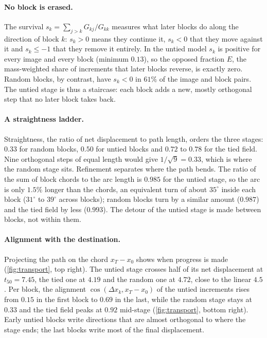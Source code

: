 \paragraph{No block is erased.}
The survival $s_k=\sum_{j>k}G_{kj}/G_{kk}$ measures what later blocks do along the
direction of block $k$: $s_k>0$ means they continue it, $s_k<0$ that they move against
it and $s_k\le-1$ that they remove it entirely.
In the untied model $s_k$ is positive for every image and every block (minimum $0.13$),
so the opposed fraction $E$, the mass-weighted share of increments that later blocks
reverse, is exactly zero.
Random blocks, by contrast, have $s_k<0$ in $61\%$ of the image and block pairs.
The untied stage is thus a staircase: each block adds a new, mostly orthogonal step
that no later block takes back.

\paragraph{A straightness ladder.}
Straightness, the ratio of net displacement to path length, orders the three stages:
$0.33$ for random blocks, $0.50$ for untied blocks and $0.72$ to $0.78$ for the tied
field.
Nine orthogonal steps of equal length would give $1/\sqrt 9=0.33$, which is where the
random stage sits.
Refinement separates where the path bends.
The ratio of the sum of block chords to the arc length is $0.985$ for the untied
stage, so the arc is only $1.5\%$ longer than the chords, an equivalent turn of about
$35^\circ$ inside each block ($31^\circ$ to $39^\circ$ across blocks); random blocks
turn by a similar amount ($0.987$) and the tied field by less ($0.993$).
The detour of the untied stage is made between blocks, not within them.

\paragraph{Alignment with the destination.}
Projecting the path on the chord $x_T-x_0$ shows when progress is made
(\cref{fig:transport}, top right).
The untied stage crosses half of its net displacement at $t_{50}{=}7.45$, the tied one
at $4.19$ and the random one at $4.72$, close to the linear $4.5$.
Per block, the alignment $\cos(\Delta x_k,x_T-x_0)$ of the untied increments rises
from $0.15$ in the first block to $0.69$ in the last, while the random stage stays at
$0.33$ and the tied field peaks at $0.92$ mid-stage (\cref{fig:transport}, bottom
right).
Early untied blocks write directions that are almost orthogonal to where the stage
ends; the last blocks write most of the final displacement.

